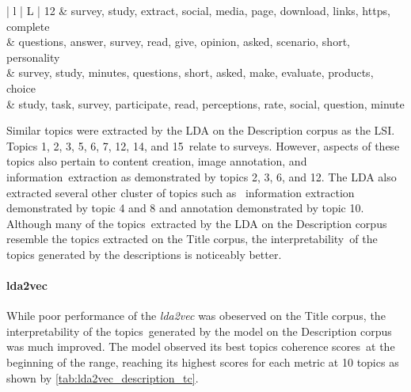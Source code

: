 \documentclass[letterpaper,12pt]{article}
\begin{document}
\begin{table}
\begin{center}
\begin{tabular}{| l | L |}
			12 &            survey, study, extract, social, media, page, download, links, https, complete \\
			 &      questions, answer, survey, read, give, opinion, asked, scenario, short, personality \\
			 &        survey, study, minutes, questions, short, asked, make, evaluate, products, choice \\
			 &      study, task, survey, participate, read, perceptions, rate, social, question, minute \\
			\hline
			\end{tabular}
	\end{center}
\end{table}

Similar topics were extracted by the LDA on the Description corpus as the LSI. Topics 1, 2, 3, 5, 6, 7, 12, 14, and 15\
relate to surveys. However, aspects of these topics also pertain to content creation, image annotation, and information\
extraction as demonstrated by topics 2, 3, 6, and 12. The LDA also extracted several other cluster of topics such as \
information extraction demonstrated by topic 4 and 8 and annotation demonstrated by topic 10. Although many of the topics\
extracted by the LDA on the Description corpus resemble the topics extracted on the Title corpus, the interpretability\
of the topics generated by the descriptions is noticeably better.

\paragraph{lda2vec}

While poor performance of the \emph{lda2vec} was obeserved on the Title corpus, the interpretability of the topics\
generated by the model on the Description corpus was much improved. The model observed its best topics coherence scores\
at the beginning of the range, reaching its highest scores for each metric at 10 topics as shown by \ref{tab:lda2vec_description_tc}.\
\end{document}
